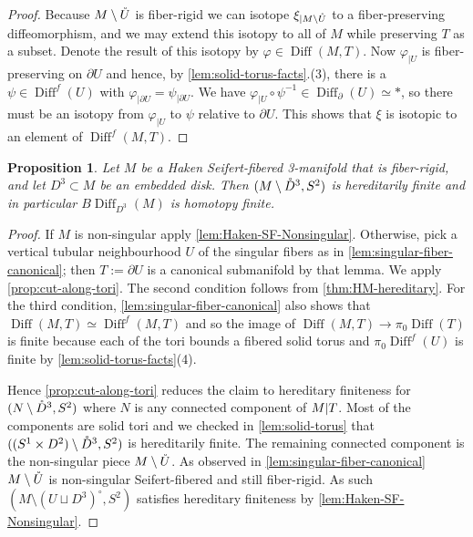 \documentclass{amsart}
\theoremstyle{plain}
\newtheorem{prop}[thm]{Proposition}
\theoremstyle{definition}
\DeclareMathOperator\Diff{Diff}
\newcommand{\interior}[1]{\smash{\mathring{#1}}}
\newcommand{\ca}{\smash{\mid}} %
\newcommand{\BDiff}{B\!\Diff}
\begin{document}
\begin{proof}
    Because $M\setminus \interior{U}$ is fiber-rigid we can isotope $\xi_{|M \setminus \interior{U}}$ to a fiber-preserving diffeomorphism, and we may extend this isotopy to all of $M$ while preserving $T$ as a subset. Denote the result of this isotopy by $\varphi\in \Diff(M, T)$.
    Now $\varphi_{|U}$ is fiber-preserving on $\partial U$ and hence, by \cref{lem:solid-torus-facts}.(3), there is a $\psi \in \Diff^f(U)$ with $\varphi_{|\partial U} = \psi_{|\partial U}$.
    We have $\varphi_{|U} \circ \psi^{-1} \in \Diff_\partial(U) \simeq *$, so there must be an isotopy from $\varphi_{|U}$ to $\psi$ relative to $\partial U$.
    This shows that $\xi$ is isotopic to an element of $\Diff^f(M, T)$.
\end{proof}


\begin{prop}\label{prop:Haken-SF-Finiteness}
    Let $M$ be a Haken Seifert-fibered 3-manifold that is fiber-rigid, and let $D^3\subset M$ be an embedded disk. 
    Then $(M \setminus \interior{D}^3, S^2)$ is hereditarily finite and in particular $\BDiff_{D^3}(M)$ is homotopy finite.
\end{prop}
\begin{proof}
    If $M$ is non-singular apply \cref{lem:Haken-SF-Nonsingular}. Otherwise, pick a vertical tubular neighbourhood $U$ of the singular fibers as in \cref{lem:singular-fiber-canonical}; then $T := \partial U$ is a canonical submanifold by that lemma.
    We apply \cref{prop:cut-along-tori}.
    The second condition follows from \cref{thm:HM-hereditary}.
    For the third condition, \cref{lem:singular-fiber-canonical} also shows that $\Diff(M, T) \simeq \Diff^f(M, T)$ and 
    so the image of $\Diff(M, T) \to \pi_0 \Diff(T)$ is finite because each of the tori bounds a fibered solid torus and $\pi_0 \Diff^f( U )$ is finite by \cref{lem:solid-torus-facts}(4).
    
    Hence \cref{prop:cut-along-tori} reduces the claim to hereditary finiteness for $(N \setminus \interior{D}^3, S^2)$ where $N$ is any connected component of $M \ca T$.
    Most of the components are solid tori and we checked in \cref{lem:solid-torus} that $((S^1 \times D^2 )\setminus \interior{D}^3, S^2)$ is hereditarily finite.
    The remaining connected component is the non-singular piece $M \setminus \interior{U}$.
    As observed in \cref{lem:singular-fiber-canonical} $M \setminus \interior{U}$ is non-singular Seifert-fibered and still fiber-rigid.
    As such $(M \setminus (U \sqcup D^3)^\circ, S^2)$ satisfies hereditary finiteness by \cref{lem:Haken-SF-Nonsingular}.
\end{proof}
\end{document}
